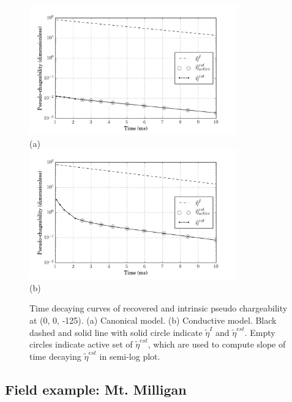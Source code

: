 \documentclass[a4paper, 11pt]{article}
\newcommand{\peta}{\tilde{\eta}}
\begin{document}
\begin{figure}[htb]
  \centering
  \includegraphics[width=0.8\textwidth]{figures/synthetic/PetaCase1_center.png} \\(a)\\
  \includegraphics[width=0.8\textwidth]{figures/synthetic/PetaCase2_center.png} \\(b)
  \caption{Time decaying curves of recovered and intrinsic pseudo chargeability at (0, 0, -125). (a) Canonical model. (b) Conductive model. Black dashed and solid line with solid circle indicate $\peta^{I}$ and $\peta^{est}$. Empty circles indicate active set of $\peta^{est}$, which are used to compute slope of time decaying $\peta^{est}$ in semi-log plot. }
  \label{F: Peta_Center}
\end{figure}

\clearpage
\subsection{Field example: Mt. Milligan}
\end{document}
